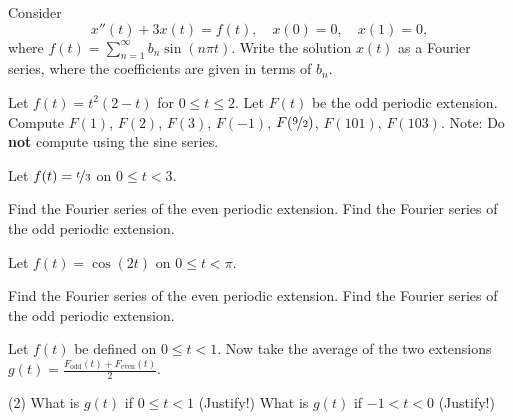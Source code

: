 \begin{exercise}
Consider
\begin{equation*}
x''(t) + 3 x(t) = f(t) , \quad x(0) = 0, \quad x(1) = 0,
\end{equation*}
where $f(t) = \sum_{n=1}^\infty b_n \sin (n \pi t)$.  Write the solution $x(t)$
as a Fourier series, where the coefficients are given in terms of $b_n$.
\end{exercise}

\begin{exercise}
Let $f(t) = t^2(2-t)$ for $0 \leq t \leq 2$.  Let $F(t)$ be the odd periodic
extension.  Compute $F(1)$, $F(2)$, $F(3)$, $F(-1)$, $F(\nicefrac{9}{2})$,
$F(101)$, $F(103)$.  Note: Do \textbf{not} compute using the sine series.
\end{exercise}

\setcounter{exercise}{100}

\begin{exercise}
Let $f(t) = \nicefrac{t}{3}$ on $0 \leq t < 3$.
\begin{tasks}
\task Find the Fourier series of the even periodic extension.
\task Find the Fourier series of the odd periodic extension.
\end{tasks}
\end{exercise}

\begin{exercise}
Let $f(t) = \cos(2t)$ on $0 \leq t < \pi$.
\begin{tasks}
\task Find the Fourier series of the even periodic extension.
\task Find the Fourier series of the odd periodic extension.
\end{tasks}
\end{exercise}

\begin{exercise}
Let $f(t)$ be defined on $0 \leq t < 1$.  Now take
the average of the two extensions
$g(t) = \frac{F_{\text{odd}}(t)+ F_{\text{even}}(t)}{2}$.
\begin{tasks}(2)
\task What is $g(t)$ if $0 \leq t < 1$ (Justify!)
\task What is $g(t)$ if $-1 < t < 0$ (Justify!)
\end{tasks}
\end{exercise}

